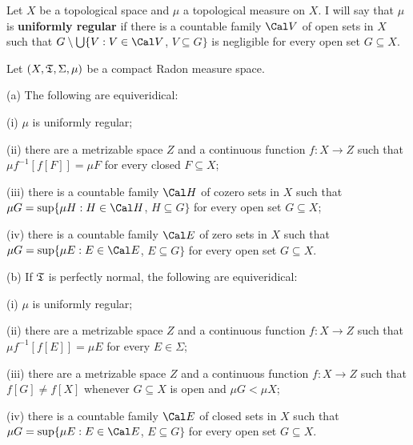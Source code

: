  Let $X$ be a topological space and $\mu$ a
topological measure on $X$.   I will say that $\mu$ is
{\bf uniformly regular} if there is a countable family $\Cal V$ of open
sets in $X$ such that $G\setminus\bigcup\{V:V\in\Cal V$, $V\subseteq G\}$
is negligible for every open set $G\subseteq X$.

 Let $(X,\frak T,\Sigma,\mu)$ be a compact Radon
measure space.

(a) The following are equiveridical:

\quad(i) $\mu$ is uniformly regular;

\quad(ii) there are a metrizable space $Z$ and a continuous function
$f:X\to Z$ such that $\mu f^{-1}[f[F]]=\mu F$ for every closed
$F\subseteq X$;

\quad(iii) there is a countable family $\Cal H$ of cozero sets in $X$
such that $\mu G=\sup\{\mu H:H\in\Cal H$, $H\subseteq G\}$ for every
open set $G\subseteq X$;

\quad(iv) there is a countable family $\Cal E$ of zero sets in $X$ such
that $\mu G=\sup\{\mu E:E\in\Cal E$, $E\subseteq G\}$ for every open set
$G\subseteq X$.

(b) If $\frak T$ is perfectly normal, the following are equiveridical:

\quad(i) $\mu$ is uniformly regular;

\quad(ii) there are a metrizable space $Z$ and a continuous function
$f:X\to Z$ such that $\mu f^{-1}[f[E]]=\mu E$ for every $E\in\Sigma$;

\quad(iii) there are a metrizable space $Z$ and a continuous function
$f:X\to Z$ such that $f[G]\ne f[X]$ whenever $G\subseteq X$ is open and
$\mu G<\mu X$;

\quad(iv) there is a countable family $\Cal E$ of closed sets in $X$
such that $\mu G=\sup\{\mu E:E\in\Cal E$, $E\subseteq G\}$ for every
open set $G\subseteq X$.

